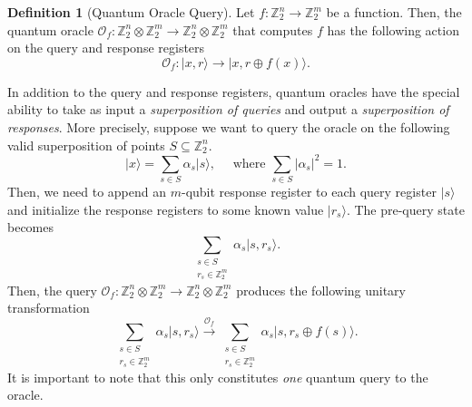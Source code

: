 \documentclass[12pt,twoside]{reedthesis}
\theoremstyle{definition}
\newtheorem{definition}[theorem]{Definition}
\newlength{\arrow}
\newcommand{\Z}{\mathbb{Z}}
\newcommand{\ket}[1]{\ensuremath{\lvert #1\rangle}\xspace}
\begin{document}
\begin{definition}[Quantum Oracle Query] Let $f: \Z_2^n \rightarrow \Z_2^m$ be a function. Then, the quantum oracle $\mathcal{O}_f : \Z_2^n \otimes \Z_2^m \rightarrow \Z_2^n \otimes \Z_2^m$ that computes $f$ has the following action on the query and response registers 
\begin{equation*}
\mathcal{O}_f : \ket{x, r} \rightarrow \ket{x, r \oplus f(x)}.
\end{equation*}
\end{definition}
In addition to the query and response registers, quantum oracles have the special ability to take as input a \textit{superposition of queries} and output a \textit{superposition of responses}. More precisely, suppose we want to query the oracle on the following valid superposition of points $S \subseteq \Z_2^n$.
\begin{equation*}
\ket{x} = \sum_{s \in S} \alpha_s \ket{s}, \quad \text{ where } \sum_{s \in S} \lvert \alpha_s\rvert^2 = 1.
\end{equation*}
Then, we need to append an $m$-qubit response register to each query register $\ket{s}$  and initialize the response registers to some known value $\ket{r_s}$. The pre-query state becomes
\begin{equation*}
\sum_{\substack{s \in S \\ r_s \in \Z_2^m}} \alpha_s \ket{s, r_s} .
\end{equation*}
Then, the query $\mathcal{O}_f:  \Z_2^n \otimes \Z_2^m \rightarrow \Z_2^n \otimes \Z_2^m$ produces the following unitary transformation
\begin{equation*}
\sum_{\substack{s \in S \\ r_s \in \Z_2^m}} \alpha_s \ket{s, r_s}  \xrightarrow{\mathcal{O}_f} \sum_{\substack{s \in S \\ r_s \in \Z_2^m}} \alpha_s \ket{s, r_s \oplus f(s)}.
\end{equation*}
It is important to note that this only constitutes \textit{one} quantum query to the oracle.
\end{document}
